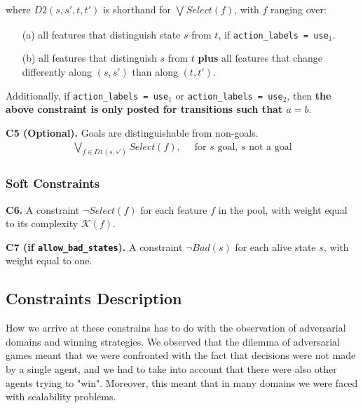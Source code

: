 \documentclass[a4paper]{article}
\newcommand{\smallpar}[1]{{\vspace{10pt}\noindent \bf #1.}}
\begin{document}
\noindent where $D2(s, s', t, t')$ is shorthand for $\bigvee_{} Select(f)$, with $f$ ranging over:
\begin{itemize}
 \item[(a)] all features that distinguish state $s$ from $t$, if \texttt{action\_labels = use$_1$}.
 \item[(b)] all features that distinguish $s$ from $t$ \textbf{plus} all features that
 change differently along $(s, s')$ than along $(t, t')$.
\end{itemize}
Additionally, if \texttt{action\_labels = use$_1$} or \texttt{action\_labels = use$_2$}, then
\textbf{the above constraint is only posted for transitions such that $a=b$}.


\smallpar{C5 (Optional)}
Goals are distinguishable from non-goals.
\begin{align*}
\bigvee_{f \in D1(s, s')} Select(f),&\;\; \text{for $s$ goal, $s$ not a goal}
\end{align*}


%

\subsubsection{Soft Constraints}
\smallpar{C6}
A constraint $\neg Select(f)$ for each feature $f$ in the pool, with weight equal to its complexity $\mathcal{K}(f)$.

\smallpar{C7 (if \texttt{allow\_bad\_states})}
A constraint $\neg Bad(s)$ for each alive state $s$, with weight equal to one.


\subsection{Constraints Description}

How we arrive at these constrains has to do with the observation of adversarial domains and winning strategies. We observed that the dilemma of adversarial games meant that we were confronted with the fact that decisions were not made by a single agent, and we had to take into account that there were also other agents trying to "win". Moreover, this meant that in many domains we were faced with scalability problems.
\end{document}
